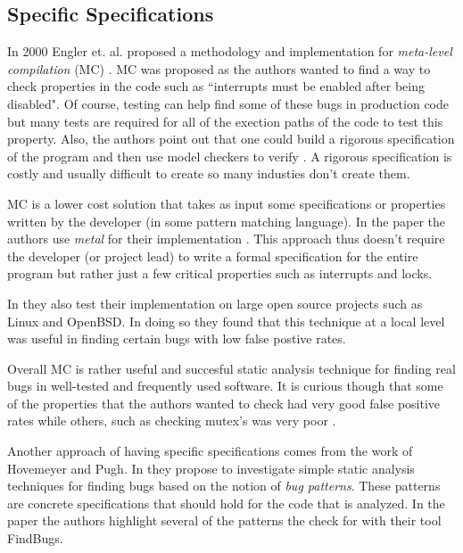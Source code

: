 \documentclass[10pt,oneside]{IEEEtran}
\begin{document}
\subsection{Specific Specifications}
In 2000 Engler et. al. proposed a methodology and implementation for \textit{meta-level compilation} (MC) \cite{5}. MC was proposed as the authors wanted to find a way to check properties in the code such as ``interrupts must be enabled after being disabled". Of course, testing can help find some of these bugs in production code but many tests are required for all of the exection paths of the code to test this property. Also, the authors point out that one could build a rigorous specification of the program and then use model checkers to verify \cite{5}. A rigorous specification is costly and usually difficult to create so many industies don't create them.

MC is a lower cost solution that takes as input some specifications or properties written by the developer (in some pattern matching language). In the paper the authors use \textit{metal} for their implementation \cite{5}. This approach thus doesn't require the developer (or project lead) to write a formal specification for the entire program but rather just a few critical properties such as interrupts and locks.

In \cite{5} they also test their implementation on large open source projects such as Linux and OpenBSD. In doing so they found that this technique at a local level was useful in finding certain bugs with low false postive rates.


Overall MC is rather useful and succesful static analysis technique for finding real bugs in well-tested and frequently used software. It is curious though that some of the properties that the authors wanted to check had very good false positive rates while others, such as checking mutex's was very poor \cite{5}.

Another approach of having specific specifications comes from the work of Hovemeyer and Pugh. In \cite{6} they propose to investigate simple static analysis techniques for finding bugs based on the notion of \textit{bug patterns}. These patterns are concrete specifications that should hold for the code that is analyzed. In the paper the authors highlight several of the patterns the check for with their tool FindBugs.
\end{document}
